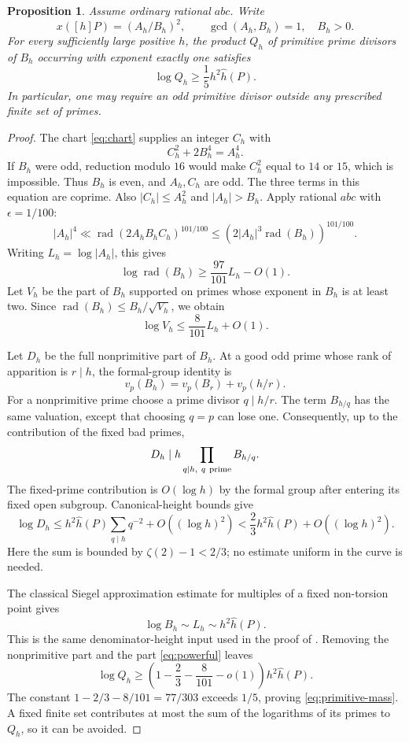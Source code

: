 \documentclass[11pt]{article}
\newtheorem{proposition}[theorem]{Proposition}
\newcommand{\rad}{\operatorname{rad}}
\newcommand{\hhat}{\widehat h}
\begin{document}
\begin{proposition}\label{prop:odd}
Assume ordinary rational \(abc\). Write
\[
 x([h]P)=(A_h/B_h)^2,\qquad
 \gcd(A_h,B_h)=1,\quad B_h>0.
\]
For every sufficiently large positive \(h\), the product \(Q_h\) of
primitive prime divisors of \(B_h\) occurring with exponent exactly one
satisfies
\begin{equation}\label{eq:primitive-mass}
                       \log Q_h\ge \frac15 h^2\hhat(P).
\end{equation}
In particular, one may require an odd primitive divisor outside any
prescribed finite set of primes.
\end{proposition}
\begin{proof}
The chart \eqref{eq:chart} supplies an integer \(C_h\) with
\[
 C_h^2+2B_h^4=A_h^4.
\]
If \(B_h\) were odd, reduction modulo \(16\) would make \(C_h^2\)
equal to \(14\) or \(15\), which is impossible. Thus \(B_h\) is even,
and \(A_h,C_h\) are odd. The three terms in this equation are coprime.
Also \(|C_h|\le A_h^2\) and \(|A_h|>B_h\).
Apply rational \(abc\) with \(\epsilon=1/100\):
\[
 |A_h|^4\ll \rad(2A_hB_hC_h)^{101/100}
          \le (2|A_h|^3\rad(B_h))^{101/100}.
\]
Writing \(L_h=\log|A_h|\), this gives
\begin{equation}\label{eq:radical}
                    \log\rad(B_h)\ge \frac{97}{101}L_h-O(1).
\end{equation}
Let \(V_h\) be the part of \(B_h\) supported on primes whose exponent
in \(B_h\) is at least two. Since
\(\rad(B_h)\le B_h/\sqrt{V_h}\), we obtain
\begin{equation}\label{eq:powerful}
                     \log V_h\le\frac8{101}L_h+O(1).
\end{equation}

Let \(D_h\) be the full nonprimitive part of \(B_h\). At a good odd
prime whose rank of apparition is \(r\mid h\), the formal-group identity
is
\[
        v_p(B_h)=v_p(B_r)+v_p(h/r).
\]
For a nonprimitive prime choose a prime divisor \(q\mid h/r\).
The term \(B_{h/q}\) has the same valuation, except that choosing
\(q=p\) can lose one. Consequently, up to the contribution of the
fixed bad primes,
\[
                    D_h\mid h\prod_{q\mid h,\ q\ {\rm prime}}B_{h/q}.
\]
The fixed-prime contribution is \(O(\log h)\) by the formal group
after entering its fixed open subgroup. Canonical-height bounds give
\[
 \log D_h\le h^2\hhat(P)\sum_{q\mid h}q^{-2}+O((\log h)^2)
          <\frac23 h^2\hhat(P)+O((\log h)^2).
\]
Here the sum is bounded by \(\zeta(2)-1<2/3\); no estimate uniform
in the curve is needed.

The classical Siegel approximation estimate for multiples of a fixed
non-torsion point gives
\[
        \log B_h\sim L_h\sim h^2\hhat(P).
\]
This is the same denominator-height input used in the proof of
\cite[Proposition~3.10]{CZ}. Removing the nonprimitive part and the
part \eqref{eq:powerful} leaves
\[
 \log Q_h\ge
 \left(1-\frac23-\frac8{101}-o(1)\right)h^2\hhat(P).
\]
The constant \(1-2/3-8/101=77/303\) exceeds \(1/5\), proving
\eqref{eq:primitive-mass}. A fixed finite set contributes at most
the sum of the logarithms of its primes to \(Q_h\), so it can be avoided.
\end{proof}
\end{document}
